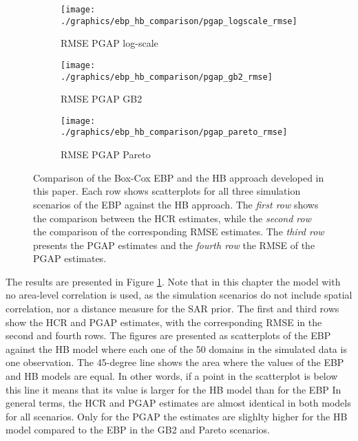\begin{figure}
    \begin{subfigure}{0.31\linewidth}
        \centering
        \texttt{[image: ./graphics/ebp\_hb\_comparison/pgap\_logscale\_rmse]}
        \caption{RMSE PGAP log-scale}
    \end{subfigure}
    \begin{subfigure}{0.31\linewidth}
        \centering
        \texttt{[image: ./graphics/ebp\_hb\_comparison/pgap\_gb2\_rmse]}
        \caption{RMSE PGAP GB2}
    \end{subfigure}
    \begin{subfigure}{0.31\linewidth}
        \centering
        \texttt{[image: ./graphics/ebp\_hb\_comparison/pgap\_pareto\_rmse]}
        \caption{RMSE PGAP Pareto}
    \end{subfigure}
    \caption[Comparison of EBP and HB approaches with simulated data.]{Comparison of the Box-Cox EBP and the HB approach developed in this paper. Each row shows scatterplots for all three simulation scenarios of the EBP against the HB approach. The \textit{first row} shows the comparison between the HCR estimates, while the \textit{second row} the comparison of the corresponding RMSE estimates. The \textit{third row} presents the PGAP estimates and the \textit{fourth row} the RMSE of the PGAP estimates.}
    \label{fig:ebp_hb_comparison}
\end{figure}

The results are presented in Figure \ref{fig:ebp_hb_comparison}.
Note that in this chapter the model with no area-level correlation is used, as the simulation scenarios do not include spatial correlation, nor a distance measure for the SAR prior.
The first and third rows show the HCR and PGAP estimates, with the corresponding RMSE in the second and fourth rows.
The figures are presented as scatterplots of the EBP against the HB model where each one of the 50 domains in the simulated data is one observation.
The 45-degree line shows the area where the values of the EBP and HB models are equal.
In other words, if a point in the scatterplot is below this line it means that its value is larger for the HB model than for the EBP
In general terms, the HCR and PGAP estimates are almost identical in both models for all scenarios.
Only for the PGAP the estimates are slighlty higher for the HB model compared to the EBP in the GB2 and Pareto scenarios.


